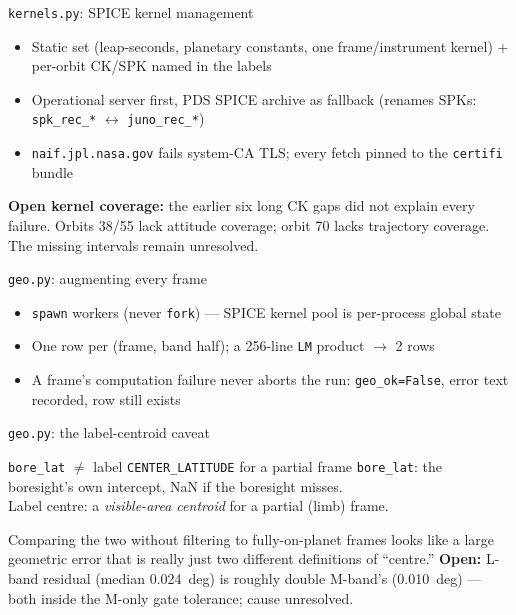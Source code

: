 \documentclass[aspectratio=169,11pt]{beamer}
\newcommand{\currevsec}{}
\newcommand{\revsec}[1]{\gdef\currevsec{#1}}
\begin{document}
\begin{frame}{\texttt{kernels.py}: SPICE kernel management}
  \revsec{4.5}
  \begin{itemize}
    \item Static set (leap-seconds, planetary constants, one frame/instrument kernel) + per-orbit CK/SPK named in the labels
    \item Operational server first, PDS SPICE archive as fallback (renames SPKs: \texttt{spk\_rec\_*} $\leftrightarrow$ \texttt{juno\_rec\_*})
    \item \texttt{naif.jpl.nasa.gov} fails system-CA TLS; every fetch pinned to the \texttt{certifi} bundle
  \end{itemize}
  \textbf{Open kernel coverage:} the earlier six long CK gaps did not explain every failure. Orbits 38/55 lack attitude coverage; orbit 70 lacks trajectory coverage. The missing intervals remain unresolved.
\end{frame}

\begin{frame}{\texttt{geo.py}: augmenting every frame}
  \revsec{4.6}
  \begin{itemize}
    \item \texttt{spawn} workers (never \texttt{fork}) --- SPICE kernel pool is per-process global state
    \item One row per (frame, band half); a 256-line \texttt{LM} product $\to$ 2 rows
    \item A frame's computation failure never aborts the run: \texttt{geo\_ok=False}, error text recorded, row still exists
  \end{itemize}
\end{frame}

\begin{frame}{\texttt{geo.py}: the label-centroid caveat}
  \revsec{4.6}
  \begin{alertblock}{\texttt{bore\_lat} $\neq$ label \texttt{CENTER\_LATITUDE} for a partial frame}
    \texttt{bore\_lat}: the boresight's own intercept, NaN if the boresight misses. \\
    Label centre: a \emph{visible-area centroid} for a partial (limb) frame.
  \end{alertblock}
  Comparing the two without filtering to fully-on-planet frames looks like a large geometric error that is really just two different definitions of ``centre.''
  \vspace{0.2cm}
  \textbf{Open:} L-band residual (median 0.024~deg) is roughly double M-band's (0.010~deg) --- both inside the M-only gate tolerance; cause unresolved.
\end{frame}
\end{document}
